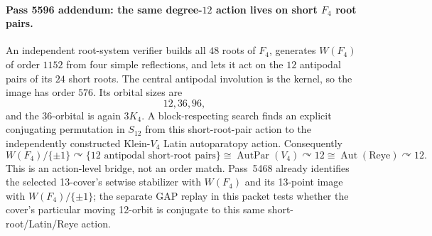\paragraph{Pass 5596 addendum: the same degree-$12$ action lives on short $F_4$ root pairs.}
An independent root-system verifier builds all $48$ roots of $F_4$, generates
$W(F_4)$ of order $1152$ from four simple reflections, and lets it act on the
$12$ antipodal pairs of its $24$ short roots.  The central antipodal involution
is the kernel, so the image has order $576$.  Its orbital sizes are
\[
\boxed{12,36,96},
\]
and the $36$-orbital is again $3K_4$.  A block-respecting search finds an
explicit conjugating permutation in $S_{12}$ from this short-root-pair action
to the independently constructed Klein-$V_4$ Latin autoparatopy action.
Consequently
\[
\boxed{
W(F_4)/\{\pm1\}\curvearrowright
\{\text{12 antipodal short-root pairs}\}
\cong
\operatorname{AutPar}(V_4)\curvearrowright12
\cong
\operatorname{Aut}(\text{Reye})\curvearrowright12.
}
\]
This is an action-level bridge, not an order match.  Pass~5468 already
identifies the selected 13-cover's setwise stabilizer with $W(F_4)$ and its
13-point image with $W(F_4)/\{\pm1\}$; the separate GAP replay in this packet
tests whether the cover's particular moving 12-orbit is conjugate to this same
short-root/Latin/Reye action.
